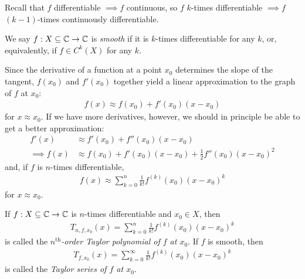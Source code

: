 \documentclass{../../template/note}
\begin{document}
    \begin{remark*}
        Recall that \(f\) differentiable \(\implies f\) continuous, so \(f\) \(k\)-times differentiable \(\implies f\) \((k-1)\)-times continuously differentiable.
    \end{remark*}
    
    \begin{definition}[Smoothness]
        We say \(f: X \subseteq \mathbb C \to \mathbb C\) is \emph{smooth} if it is \(k\)-times differentiable for any \(k\), or, equivalently, if \(f \in C^k(X)\) for any \(k\).
    \end{definition}
    
    Since the derivative of a function at a point \(x_0\) determines the slope of the tangent, \(f(x_0)\) and \(f'(x_0)\) together yield a linear approximation to the graph of \(f\) at \(x_0\):
    \begin{align*}
        f(x) \approx f(x_0) + f'(x_0)(x-x_0)
    \end{align*}
    for \(x \approx x_0\). If we have more derivatives, however, we should in principle be able to get a better approximation:
    \begin{align*}
        f'(x) &\approx f'(x_0) + f''(x_0)(x-x_0) \\
        \implies f(x) &\approx f(x_0) + f'(x_0)(x-x_0) + \frac 1 2 f''(x_0)(x-x_0)^2 
    \end{align*}
    and, if \(f\) is \(n\)-times differentiable,
    \begin{align*}
        f(x) \approx \sum_{k=0}^n \frac 1 {k!} f^{(k)}(x_0)(x-x_0)^k
    \end{align*}
    for \(x \approx x_0\).    
    
    \begin{definition}
        If \(f: X \subseteq \mathbb C \to \mathbb C\) is \(n\)-times differentiable and \(x_0 \in X\), then
        \begin{align*}
            T_{n,f,x_0}(x) = \sum_{k=0}^n \frac 1 {k!} f^{(k)}(x_0)(x-x_0)^k
        \end{align*}
        is called the \emph{\(n^\text{th}\)-order Taylor polynomial of \(f\) at \(x_0\)}. If \(f\) is smooth, then
        \begin{align*}
            T_{f,x_0}(x) = \sum_{k=0}^\infty \frac 1 {k!} f^{(k)}(x_0)(x-x_0)^k
        \end{align*}
        is called the \emph{Taylor series of \(f\) at \(x_0\)}.        
    \end{definition}
    
\end{document}
